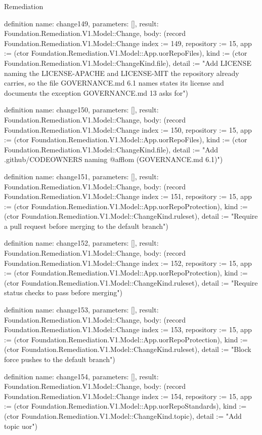 \begin{lexlean}{Remediation}
\begin{semanticmodule}
definition{
  name: change149,
  parameters: [],
  result: Foundation.Remediation.V1.Model::Change,
  body: (record Foundation.Remediation.V1.Model::Change {index := 149, repository := 15, app := (ctor Foundation.Remediation.V1.Model::App.uorRepoFiles), kind := (ctor Foundation.Remediation.V1.Model::ChangeKind.file), detail := "Add LICENSE naming the LICENSE-APACHE and LICENSE-MIT the repository already carries, so the file GOVERNANCE.md 6.1 names states its license and documents the exception GOVERNANCE.md 13 asks for"})
}

definition{
  name: change150,
  parameters: [],
  result: Foundation.Remediation.V1.Model::Change,
  body: (record Foundation.Remediation.V1.Model::Change {index := 150, repository := 15, app := (ctor Foundation.Remediation.V1.Model::App.uorRepoFiles), kind := (ctor Foundation.Remediation.V1.Model::ChangeKind.file), detail := "Add .github/CODEOWNERS naming @afflom (GOVERNANCE.md 6.1)"})
}

definition{
  name: change151,
  parameters: [],
  result: Foundation.Remediation.V1.Model::Change,
  body: (record Foundation.Remediation.V1.Model::Change {index := 151, repository := 15, app := (ctor Foundation.Remediation.V1.Model::App.uorRepoProtection), kind := (ctor Foundation.Remediation.V1.Model::ChangeKind.ruleset), detail := "Require a pull request before merging to the default branch"})
}

definition{
  name: change152,
  parameters: [],
  result: Foundation.Remediation.V1.Model::Change,
  body: (record Foundation.Remediation.V1.Model::Change {index := 152, repository := 15, app := (ctor Foundation.Remediation.V1.Model::App.uorRepoProtection), kind := (ctor Foundation.Remediation.V1.Model::ChangeKind.ruleset), detail := "Require status checks to pass before merging"})
}

definition{
  name: change153,
  parameters: [],
  result: Foundation.Remediation.V1.Model::Change,
  body: (record Foundation.Remediation.V1.Model::Change {index := 153, repository := 15, app := (ctor Foundation.Remediation.V1.Model::App.uorRepoProtection), kind := (ctor Foundation.Remediation.V1.Model::ChangeKind.ruleset), detail := "Block force pushes to the default branch"})
}

definition{
  name: change154,
  parameters: [],
  result: Foundation.Remediation.V1.Model::Change,
  body: (record Foundation.Remediation.V1.Model::Change {index := 154, repository := 15, app := (ctor Foundation.Remediation.V1.Model::App.uorRepoStandards), kind := (ctor Foundation.Remediation.V1.Model::ChangeKind.topic), detail := "Add topic uor"})
}


\end{semanticmodule}
\end{lexlean}
